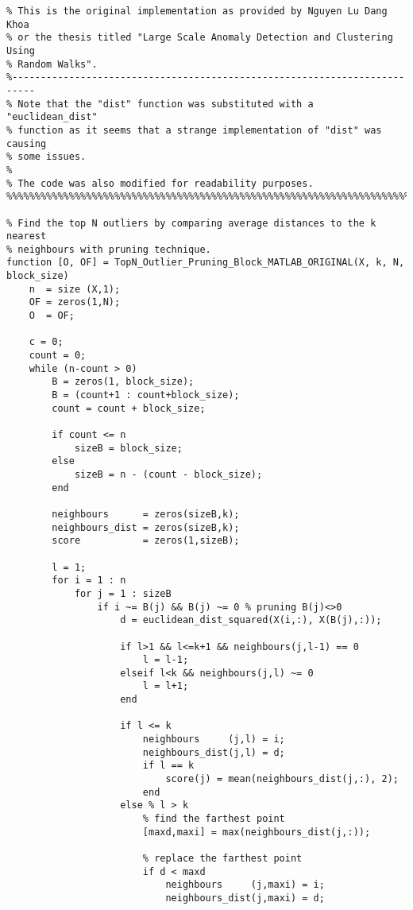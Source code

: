 \lstset{language=Matlab}
\begin{lstlisting}
% This is the original implementation as provided by Nguyen Lu Dang Khoa
% or the thesis titled "Large Scale Anomaly Detection and Clustering Using
% Random Walks".
%--------------------------------------------------------------------------
% Note that the "dist" function was substituted with a "euclidean_dist"
% function as it seems that a strange implementation of "dist" was causing
% some issues.
%
% The code was also modified for readability purposes.
%%%%%%%%%%%%%%%%%%%%%%%%%%%%%%%%%%%%%%%%%%%%%%%%%%%%%%%%%%%%%%%%%%%%%%%%%%%

% Find the top N outliers by comparing average distances to the k nearest
% neighbours with pruning technique.
function [O, OF] = TopN_Outlier_Pruning_Block_MATLAB_ORIGINAL(X, k, N, block_size)
    n  = size (X,1);
    OF = zeros(1,N);
    O  = OF;

    c = 0;
    count = 0;
    while (n-count > 0)
        B = zeros(1, block_size);
        B = (count+1 : count+block_size);
        count = count + block_size;

        if count <= n
            sizeB = block_size;
        else
            sizeB = n - (count - block_size);
        end

        neighbours      = zeros(sizeB,k);
        neighbours_dist = zeros(sizeB,k);
        score           = zeros(1,sizeB);

        l = 1;
        for i = 1 : n
            for j = 1 : sizeB
                if i ~= B(j) && B(j) ~= 0 % pruning B(j)<>0
                    d = euclidean_dist_squared(X(i,:), X(B(j),:));

                    if l>1 && l<=k+1 && neighbours(j,l-1) == 0
                        l = l-1;
                    elseif l<k && neighbours(j,l) ~= 0
                        l = l+1;
                    end

                    if l <= k
                        neighbours     (j,l) = i;
                        neighbours_dist(j,l) = d;
                        if l == k
                            score(j) = mean(neighbours_dist(j,:), 2);
                        end
                    else % l > k
                        % find the farthest point
                        [maxd,maxi] = max(neighbours_dist(j,:));

                        % replace the farthest point
                        if d < maxd
                            neighbours     (j,maxi) = i;
                            neighbours_dist(j,maxi) = d;


\end{lstlisting}
